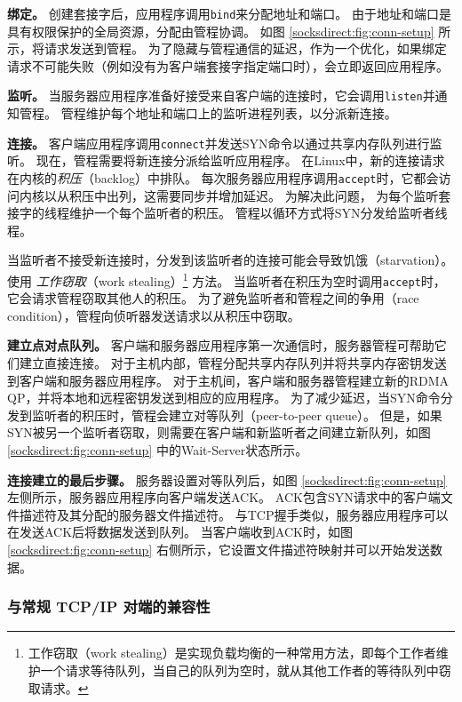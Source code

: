 \textbf{绑定。}
创建套接字后，应用程序调用\texttt {bind}来分配地址和端口。
由于地址和端口是具有权限保护的全局资源，分配由管程协调。
如图 \ref {socksdirect:fig:conn-setup} 所示，\libipc {}将请求发送到管程。
为了隐藏与管程通信的延迟，作为一个优化，如果绑定请求不可能失败（例如没有为客户端套接字指定端口时），\libipc {}会立即返回应用程序。

\textbf{监听。}
当服务器应用程序准备好接受来自客户端的连接时，它会调用\texttt {listen}并通知管程。
管程维护每个地址和端口上的监听进程列表，以分派新连接。


\textbf{连接。}
客户端应用程序调用\texttt {connect}并发送SYN命令以通过共享内存队列进行监听。
现在，管程需要将新连接分派给监听应用程序。
在Linux中，新的连接请求在内核的\emph {积压}（backlog）中排队。
每次服务器应用程序调用\texttt {accept}时，它都会访问内核以从积压中出列，这需要同步并增加延迟。
为解决此问题，\sys{} 为每个监听套接字的线程维护一个每个监听者的积压。
管程以循环方式将SYN分发给监听者线程。

当监听者不接受新连接时，分发到该监听者的连接可能会导致饥饿（starvation）。
\sys{} 使用 \emph {工作窃取}（work stealing）\footnote{工作窃取（work stealing）是实现负载均衡的一种常用方法，即每个工作者维护一个请求等待队列，当自己的队列为空时，就从其他工作者的等待队列中窃取请求。} 方法。
当监听者在积压为空时调用\texttt {accept}时，它会请求管程窃取其他人的积压。
为了避免监听者和管程之间的争用（race condition），管程向侦听器发送请求以从积压中窃取。

\textbf {建立点对点队列。}
客户端和服务器应用程序第一次通信时，服务器管程可帮助它们建立直接连接。
对于主机内部，管程分配共享内存队列并将共享内存密钥发送到客户端和服务器应用程序。
对于主机间，客户端和服务器管程建立新的RDMA QP，并将本地和远程密钥发送到相应的应用程序。
为了减少延迟，当SYN命令分发到监听者的积压时，管程会建立对等队列（peer-to-peer queue）。
但是，如果SYN被另一个监听者窃取，则需要在客户端和新监听者之间建立新队列，如图 \ref {socksdirect:fig:conn-setup} 中的Wait-Server状态所示。

\textbf {连接建立的最后步骤。}
服务器设置对等队列后，如图 \ref {socksdirect:fig:conn-setup} 左侧所示，服务器应用程序向客户端发送ACK。 ACK包含SYN请求中的客户端文件描述符及其分配的服务器文件描述符。
与TCP握手类似，服务器应用程序可以在发送ACK后将数据发送到队列。
当客户端收到ACK时，如图 \ref {socksdirect:fig:conn-setup} 右侧所示，它设置文件描述符映射并可以开始发送数据。


\subsubsection{与常规 TCP/IP 对端的兼容性}


